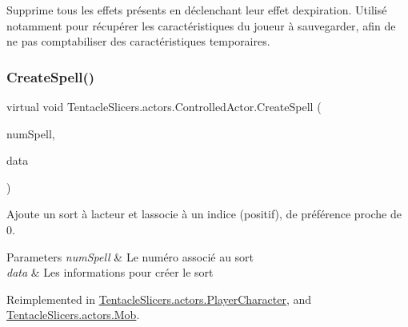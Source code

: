 Supprime tous les effets présents en déclenchant leur effet d\textquotesingle{}expiration. Utilisé notamment pour récupérer les caractéristiques du joueur à sauvegarder, afin de ne pas comptabiliser des caractéristiques temporaires. 

\mbox{\label{class_tentacle_slicers_1_1actors_1_1_controlled_actor_afcfec115f484efa6142c2f82e1a1f4d5}} 
\subsubsection{\texorpdfstring{Create\+Spell()}{CreateSpell()}}
{\footnotesize\ttfamily virtual void Tentacle\+Slicers.\+actors.\+Controlled\+Actor.\+Create\+Spell (\begin{DoxyParamCaption}\item[{int}]{num\+Spell,  }\item[{\hyperlink{class_tentacle_slicers_1_1spells_1_1_spell_data}{Spell\+Data}}]{data }\end{DoxyParamCaption})\hspace{0.3cm}{\ttfamily [virtual]}}



Ajoute un sort à l\textquotesingle{}acteur et l\textquotesingle{}associe à un indice (positif), de préférence proche de 0. 


\begin{DoxyParams}{Parameters}
{\em num\+Spell} & Le numéro associé au sort \\
\hline
{\em data} & Les informations pour créer le sort \\
\hline
\end{DoxyParams}


Reimplemented in \hyperlink{class_tentacle_slicers_1_1actors_1_1_player_character_a7d7616298f1762e11f8824f0b77dec64}{Tentacle\+Slicers.\+actors.\+Player\+Character}, and \hyperlink{class_tentacle_slicers_1_1actors_1_1_mob_a79c96a3a4ea1b3a874e28a467683dd39}{Tentacle\+Slicers.\+actors.\+Mob}.

\mbox{\label{class_tentacle_slicers_1_1actors_1_1_controlled_actor_a1a596b1707287204516bbd7e5489fd85}} 
